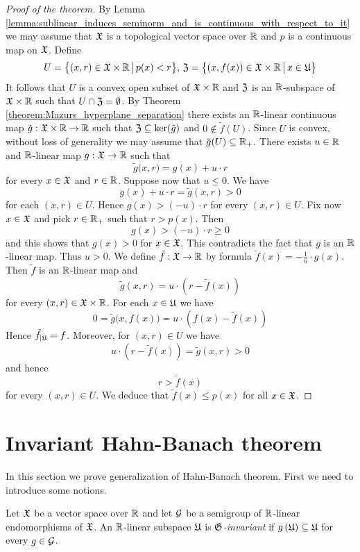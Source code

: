 \begin{proof}[Proof of the theorem]
By Lemma \ref{lemma:sublinear_induces_seminorm_and_is_continuous_with_respect_to_it} we may assume that ${\mathfrak X}$ is a topological vector space over ${\mathbb R}$ and $p$ is a continuous map on ${\mathfrak X}$. Define
$$U = \big\{(x,r)\in {\mathfrak X}\times {\mathbb R}\,\big|\,p(x) < r\big\},\,{\mathfrak Z} = \big\{(x,f(x))\in {\mathfrak X}\times {\mathbb R}\,\big|\,x\in {\mathfrak U}\big\}$$ 
It follows that $U$ is a convex open subset of ${\mathfrak X}\times {\mathbb R}$ and ${\mathfrak Z}$ is an ${\mathbb R}$-subspace of ${\mathfrak X}\times {\mathbb R}$ such that $U \cap {\mathfrak Z} = \emptyset$. By Theorem \ref{theorem:Mazurs_hyperplane_separation} there exists an ${\mathbb R}$-linear continuous map $\tilde{g}:{\mathfrak X}\times {\mathbb R}\rightarrow {\mathbb R}$ such that ${\mathfrak Z}\subseteq \ker(\tilde{g})$ and $0 \not \in \tilde{f}(U)$. Since $U$ is convex, without loss of generality we may assume that $\tilde{g}(U)\subseteq {\mathbb R}_+$. There exists $u \in {\mathbb R}$ and ${\mathbb R}$-linear map $g:{\mathfrak X}\rightarrow {\mathbb R}$ such that 
$$\tilde{g}\big(x, r\big) = g(x) + u\cdot r$$
for every $x \in {\mathfrak X}$ and $r \in {\mathbb R}$. Suppose now that $u \leq 0$. We have
$$g(x) + u\cdot r = \tilde{g}(x,r) > 0$$
for each $(x,r) \in U$. Hence $g(x) > (- u) \cdot r$ for every $(x,r) \in U$. Fix now $x\in {\mathfrak X}$ and pick $r \in {\mathbb R}_+$ such that $r > p(x)$. Then 
$$g(x) > (-u)\cdot r \geq 0$$ 
and this shows that $g(x) > 0$ for $x\in {\mathfrak X}$. This contradicts the fact that $g$ is an ${\mathbb R}$-linear map. Thus $u > 0$. We define $\tilde{f}:{\mathfrak X}\rightarrow {\mathbb R}$ by formula $\tilde{f}(x) = -\frac{1}{u}\cdot g(x)$. Then $\tilde{f}$ is an ${\mathbb R}$-linear map and $$\tilde{g}(x, r) = u \cdot \left(r - \tilde{f}(x)\right)$$
for every $(x,r) \in {\mathfrak X}\times {\mathbb R}$. For each $x \in {\mathfrak U}$ we have
$$0 = \tilde{g}\big(x,f(x)\big) = u \cdot \left(f(x) - \tilde{f}(x)\right)$$
Hence $\tilde{f}_{\mid {\mathfrak U}} = f$. Moreover, for $(x,r) \in U$ we have 
$$u\cdot \left(r - \tilde{f}(x)\right) = \tilde{g}(x, r) > 0$$
and hence
$$r > \tilde{f}(x)$$
for every $(x,r)\in U$. We deduce that $\tilde{f}(x) \leq p(x)$ for all $x\in {\mathfrak X}$. 
\end{proof}


\section{Invariant Hahn-Banach theorem}
\noindent
In this section we prove generalization of Hahn-Banach theorem. First we need to introduce some notions.

\begin{definition}
Let ${\mathfrak X}$ be a vector space over ${\mathbb R}$ and let ${\mathcal G}$ be a semigroup of ${\mathbb R}$-linear endomorphisms of ${\mathfrak X}$. An ${\mathbb R}$-linear subspace ${\mathfrak U}$ is \textit{${\mathfrak G}$-invariant} if $g\left({\mathfrak U}\right)\subseteq {\mathfrak U}$ for every $g\in {\mathcal G}$.
\end{definition}

